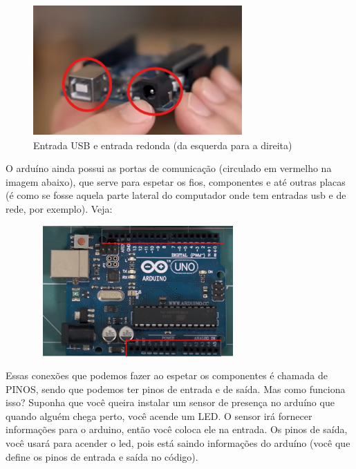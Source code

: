 \documentclass{report}
\begin{document}
	\begin{figure}[ht]
		\centering
		\includegraphics[width=8cm,height=5cm,keepaspectratio=false]{imagens/entradas.png}
		
		\caption{Entrada USB e entrada redonda (da esquerda para a direita)}
		
	\end{figure}
	
	O arduíno ainda possui as portas de comunicação (circulado em vermelho na imagem abaixo), que serve para espetar os fios, componentes e até outras placas (é como se fosse aquela parte lateral do computador onde tem entradas usb e de rede, por exemplo). Veja:
	
	\begin{figure}[ht]
		\centering
		\includegraphics[width=8cm,height=5cm,keepaspectratio=false]{imagens/portas.png}
		
	\end{figure}
	
	
	Essas conexões que podemos fazer ao espetar os componentes é chamada de PINOS, sendo que podemos ter pinos de entrada e de saída. Mas como funciona isso? Suponha que você queira instalar um sensor de presença no arduíno que quando alguém chega perto, você acende um LED. O sensor irá fornecer informações para o arduino, então você coloca ele na entrada. Os pinos de saída, você usará para acender o led, pois está saindo informações do arduíno (você que define os pinos de entrada e saída no código).
	
\end{document}
